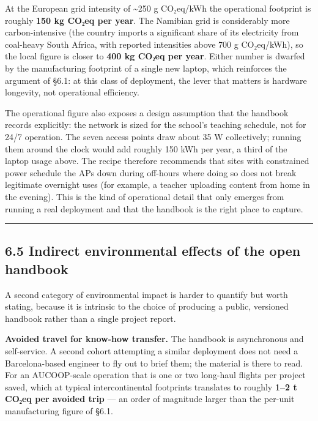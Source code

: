 At the European grid intensity of \textasciitilde250 g CO₂eq/kWh the
operational footprint is roughly \textbf{150 kg CO₂eq per year}. The
Namibian grid is considerably more carbon-intensive (the country imports
a significant share of its electricity from coal-heavy South Africa,
with reported intensities above 700 g CO₂eq/kWh), so the local figure is
closer to \textbf{400 kg CO₂eq per year}. Either number is dwarfed by
the manufacturing footprint of a single new laptop, which reinforces the
argument of §6.1: at this class of deployment, the lever that matters is
hardware longevity, not operational efficiency.

The operational figure also exposes a design assumption that the
handbook records explicitly: the network is sized for the school's
teaching schedule, not for 24/7 operation. The seven access points draw
about 35 W collectively; running them around the clock would add roughly
150 kWh per year, a third of the laptop usage above. The recipe
therefore recommends that sites with constrained power schedule the APs
down during off-hours where doing so does not break legitimate overnight
uses (for example, a teacher uploading content from home in the
evening). This is the kind of operational detail that only emerges from
running a real deployment and that the handbook is the right place to
capture.

\begin{center}\rule{0.5\linewidth}{0.5pt}\end{center}

\hypertarget{indirect-environmental-effects-of-the-open-handbook}{%
\subsection{6.5 Indirect environmental effects of the open
handbook}\label{indirect-environmental-effects-of-the-open-handbook}}

A second category of environmental impact is harder to quantify but
worth stating, because it is intrinsic to the choice of producing a
public, versioned handbook rather than a single project report.

\textbf{Avoided travel for know-how transfer.} The handbook is
asynchronous and self-service. A second cohort attempting a similar
deployment does not need a Barcelona-based engineer to fly out to brief
them; the material is there to read. For an AUCOOP-scale operation that
is one or two long-haul flights per project saved, which at typical
intercontinental footprints translates to roughly \textbf{1--2 t CO₂eq
per avoided trip} --- an order of magnitude larger than the per-unit
manufacturing figure of §6.1.

